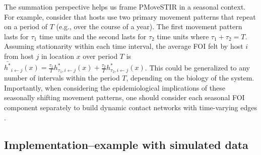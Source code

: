 \documentclass[letterpaper]{article}
\begin{document}
The summation perspective helps us frame PMoveSTIR in a seasonal context.  For example, consider that hosts use two primary movement patterns that repeat on a period of $T$ (e.g., over the course of a year).  The first movement pattern lasts for $\tau_1$ time units and the second lasts for $\tau_2$ time units where $\tau_1 + \tau_2 = T$.  Assuming stationarity within each time interval, the average FOI felt by host $i$ from host $j$ in location $x$ over period $T$ is $\bar{h^*}_{i \leftarrow j}(x) = \frac{\tau_1}{T} h^*_{\tau_1, i \leftarrow j}(x) + \frac{\tau_2}{T} h^*_{\tau_2, i \leftarrow j}(x)$.  This could be generalized to any number of intervals within the period $T$, depending on the biology of the system.  Importantly, when considering the epidemiological implications of these seasonally shifting movement patterns, one should consider each seasonal FOI component separately to build dynamic contact networks with time-varying edges \citep{Wilber2022}.

\subsection*{Implementation--example with simulated data}
\end{document}
